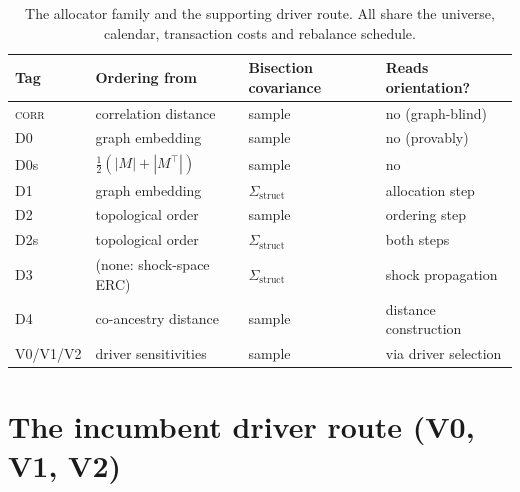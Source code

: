 \begin{table}[t]
  \centering
  \caption{The allocator family and the supporting driver route. All share
    the universe, calendar, transaction costs and rebalance schedule.}
  \label{tab:variants}
  \begin{tabular}{l l l l}
    \toprule
    Tag & Ordering from & Bisection covariance & Reads orientation? \\
    \midrule
    \textsc{corr} & correlation distance & sample & no (graph-blind) \\
    D0            & graph embedding      & sample & no (provably) \\
    D0s           & $\tfrac{1}{2}(|M|{+}|M^\top|)$ & sample & no \\
    D1            & graph embedding      & $\Sigma_{\mathrm{struct}}$ & allocation step \\
    D2            & topological order    & sample & ordering step \\
    D2s           & topological order    & $\Sigma_{\mathrm{struct}}$ & both steps \\
    D3            & (none: shock-space ERC) & $\Sigma_{\mathrm{struct}}$ & shock propagation \\
    D4            & co-ancestry distance & sample & distance construction \\
    \midrule
    V0/V1/V2      & driver sensitivities & sample & via driver selection \\
    \bottomrule
  \end{tabular}
\end{table}

\section{The incumbent driver route (V0, V1, V2)}
\label{sec:driver-route}

